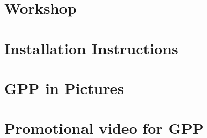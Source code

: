  \appendix

\chapter{Workshop}


\chapter{Installation Instructions}


%

\chapter{GPP in Pictures}


\chapter{Promotional video for GPP}

